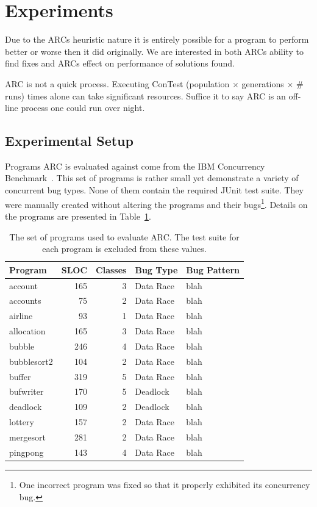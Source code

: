 \documentclass{llncs}
\begin{document}
\section{Experiments}
\label{sec:experiments}

Due to the ARCs heuristic nature it is entirely possible for a program to
perform better or worse then it did originally. We are interested in both ARCs
ability to find fixes and ARCs effect on performance of solutions found.

ARC is not a quick process. Executing ConTest (population $\times$ generations
$\times$ \# runs) times alone can take significant resources. Suffice it to say
ARC is an off-line process one could run over night.

\subsection{Experimental Setup}
\label{sec:experimental_setup}

Programs ARC is evaluated against come from the IBM Concurrency
Benchmark~\cite{EHSU06}. This set of programs is rather small yet demonstrate a
variety of concurrent bug types. None of them contain the required JUnit test
suite. They were manually created without altering the programs and their
bugs\footnote{One incorrect program was fixed so that it properly exhibited its
concurrency bug.}. Details on the programs are presented in
Table~\ref{tbl:used_programs}.

\begin{table}[!h]
\caption{The set of programs used to evaluate ARC. The test suite for each
program is excluded from these values.}
\begin{center}
\begin{tabular}{|l|r|r|l|l|}
\hline
\textbf{Program} & \textbf{SLOC} & \textbf{Classes} & \textbf{Bug Type} & \textbf{Bug Pattern}\\
\hline
account & 165 & 3 & Data Race & blah\\
\hline
accounts & 75 & 2 & Data Race & blah\\
\hline
airline & 93 & 1 & Data Race & blah\\
\hline
allocation & 165 & 3 & Data Race & blah\\
\hline
bubble & 246 & 4 & Data Race & blah\\
\hline
bubblesort2 & 104 & 2 & Data Race & blah\\
\hline
buffer & 319 & 5 & Data Race & blah\\
\hline
bufwriter & 170 & 5 & Deadlock & blah\\
\hline
deadlock & 109 & 2 & Deadlock & blah\\
\hline
lottery & 157 & 2 & Data Race & blah\\
\hline
mergesort & 281 & 2 & Data Race & blah\\
\hline
pingpong & 143 & 4 & Data Race & blah\\
\hline
\end{tabular}
\label{tbl:used_programs}
\end{center}
\end{table}
\end{document}
